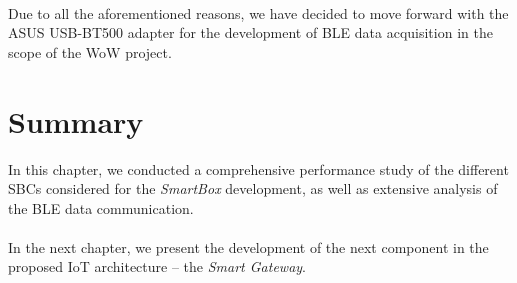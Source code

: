 \paragraph{} Due to all the aforementioned reasons, we have decided to move forward with the ASUS USB-BT500 adapter for the development of \acs{BLE} data acquisition in the scope of the \acs{WoW} project.

\section{Summary}
In this chapter, we conducted a comprehensive performance study of the different \acs{SBC}s considered for the \textit{SmartBox} development, as well as extensive analysis of the \acs{BLE} data communication.

\paragraph{} In the next chapter, we present the development of the next component in the proposed \acs{IoT} architecture -- the \textit{Smart Gateway}.